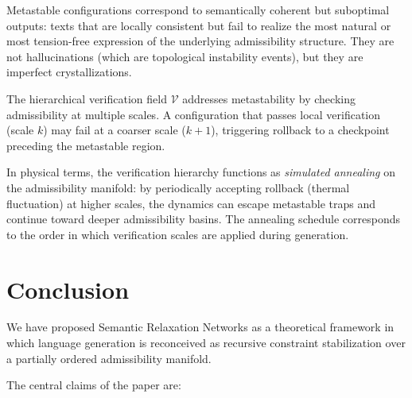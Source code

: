 \documentclass[11pt, a4paper]{article}
\theoremstyle{srn}
\theoremstyle{srnremark}
\begin{document}
Metastable configurations correspond to semantically coherent but
suboptimal outputs: texts that are locally consistent but fail to
realize the most natural or most tension-free expression of the
underlying admissibility structure.
They are not hallucinations (which are topological instability events),
but they are imperfect crystallizations.

The hierarchical verification field $\mathcal{V}$ addresses
metastability by checking admissibility at multiple scales.
A configuration that passes local verification (scale $k$) may fail
at a coarser scale ($k+1$), triggering rollback to a checkpoint
preceding the metastable region.

In physical terms, the verification hierarchy functions as
\emph{simulated annealing} on the admissibility manifold: by
periodically accepting rollback (thermal fluctuation) at higher
scales, the dynamics can escape metastable traps and continue toward
deeper admissibility basins.
The annealing schedule corresponds to the order in which verification
scales are applied during generation.

\section{Conclusion}
\label{sec:conclusion}

We have proposed Semantic Relaxation Networks as a theoretical
framework in which language generation is reconceived as recursive
constraint stabilization over a partially ordered admissibility
manifold.

The central claims of the paper are:
\end{document}
